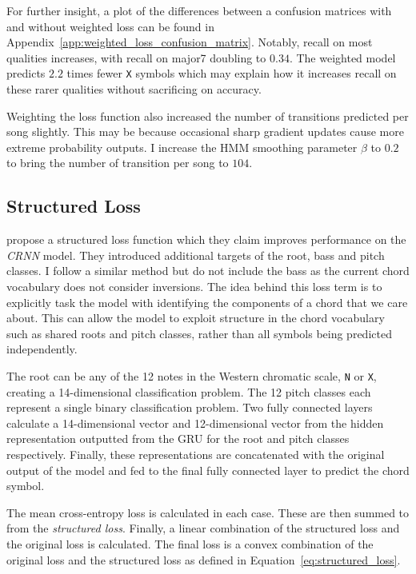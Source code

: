 For further insight, a plot of the differences between a confusion matrices with and without weighted loss can be found in Appendix~\ref{app:weighted_loss_confusion_matrix}. Notably, recall on most qualities increases, with recall on major7 doubling to $0.34$. The weighted model predicts $2.2$ times fewer \texttt{X} symbols which may explain how it increases recall on these rarer qualities without sacrificing on accuracy. 

Weighting the loss function also increased the number of transitions predicted per song slightly. This may be because occasional sharp gradient updates cause more extreme probability outputs. I increase the HMM smoothing parameter $\beta$ to $0.2$ to bring the number of transition per song to $104$.

\subsection{Structured Loss}\label{sec:structured_loss}

\citet{StructuredTraining} propose a structured loss function which they claim improves performance on the \emph{CRNN} model. They introduced additional targets of the root, bass and pitch classes. I follow a similar method but do not include the bass as the current chord vocabulary does not consider inversions. The idea behind this loss term is to explicitly task the model with identifying the components of a chord that we care about. This can allow the model to exploit structure in the chord vocabulary such as shared roots and pitch classes, rather than all symbols being predicted independently.

The root can be any of the 12 notes in the Western chromatic scale, \texttt{N} or \texttt{X}, creating a 14-dimensional classification problem. The 12 pitch classes each represent a single binary classification problem. Two fully connected layers calculate a 14-dimensional vector and 12-dimensional vector from the hidden representation outputted from the GRU for the root and pitch classes respectively. Finally, these representations are concatenated with the original output of the model and fed to the final fully connected layer to predict the chord symbol.

The mean cross-entropy loss is calculated in each case. These are then summed to from the \emph{structured loss}. Finally, a linear combination of the structured loss and the original loss is calculated. The final loss is a convex combination of the original loss and the structured loss as defined in Equation~\ref{eq:structured_loss}.

